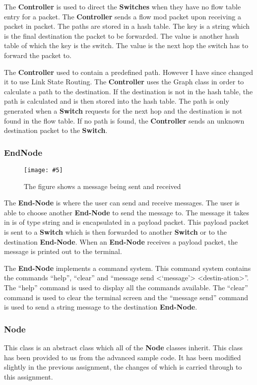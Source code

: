 \documentclass{article}
\newcommand{\includescalefigure}[5]{
  \begin{figure}[H]
    \centering
    \texttt{[image: \#5]}
    \captionsetup{width=.8\linewidth}
    \caption[#2]{#3}
    \label{#1}
  \end{figure}
}
\begin{document}
The \textbf{Controller} is used to direct the \textbf{Switches} when they have
no flow table entry for a packet. The \textbf{Controller} sends a flow mod
packet upon receiving a packet in packet. The paths are stored in a hash table.
The key is a string which is the final destination the packet to be forwarded.
The value is another hash table of which the key is the switch. The value is the
next hop the switch has to forward the packet to.

The \textbf{Controller} used to contain a predefined path. However I have since
changed it to use Link State Routing. The \textbf{Controller} uses the Graph
class in order to calculate a path to the destination. If the destination is not
in the hash table, the path is calculated and is then stored into the hash table.
The path is only generated when a \textbf{Switch} requests for the next hop and
the destination is not found in the flow table. If no path is found, the
\textbf{Controller} sends an unknown destination packet to the \textbf{Switch}.

\subsubsection{EndNode}

\includescalefigure{EndNodeMessageSend}{Message send and
  receive}{The figure shows a message being sent and
received}{1}{EndNodeMessageSend.png}

The \textbf{End-Node} is where the user can send and receive messages. The user
is able to choose another \textbf{End-Node} to send the message to. The message
it takes in is of type string and is encapsulated in a payload packet. This
payload packet is sent to a \textbf{Switch} which is then forwarded to another
\textbf{Switch} or to the destination \textbf{End-Node}. When an \textbf{End-Node}
receives a payload packet, the message is printed out to the terminal.

The \textbf{End-Node} implements a command system. This command system contains
the commands ``help'', ``clear'' and ``message send
\textless`message'\textgreater
\textless{}destin-\newline{}ation\textgreater{}''. The ``help'' command is used
to display all the commands available. The ``clear'' command is used to clear the
terminal screen and the ``message send'' command is used to send a string
message to the destination \textbf{End-Node}.

\subsubsection{Node}
This class is an abstract class which all of the \textbf{Node} classes inherit.
This class has been provided to us from the advanced sample code. It has been
modified slightly in the previous assignment, the changes of which is carried
through to this assignment.
\end{document}
